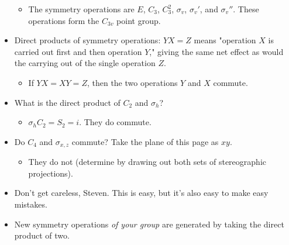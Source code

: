 \documentclass[../notes.tex]{subfiles}
\begin{document}
\begin{itemize}
\begin{itemize}
        \item The symmetry operations are $E$, $C_3$, $C_3^2$, $\sigma_v$, $\sigma_v'$, and $\sigma_v''$. These operations form the $C_{3v}$ point group.
    \end{itemize}
    \item Direct products of symmetry operations: $YX=Z$ means "operation $X$ is carried out first and then operation $Y$," giving the same net effect as would the carrying out of the single operation $Z$.
    \begin{itemize}
        \item If $YX=XY=Z$, then the two operations $Y$ and $X$ commute.
    \end{itemize}
    \item What is the direct product of $C_2$ and $\sigma_h$?
    \begin{itemize}
        \item $\sigma_hC_2=S_2=i$. They do commute.
    \end{itemize}
    \item Do $C_4$ and $\sigma_{x,z}$ commute? Take the plane of this page as $xy$.
    \begin{itemize}
        \item They do not (determine by drawing out both sets of stereographic projections).
    \end{itemize}
    \item Don't get careless, Steven. This is easy, but it's also easy to make easy mistakes.
    \item New symmetry operations \emph{of your group} are generated by taking the direct product of two.
\end{itemize}
\end{document}
